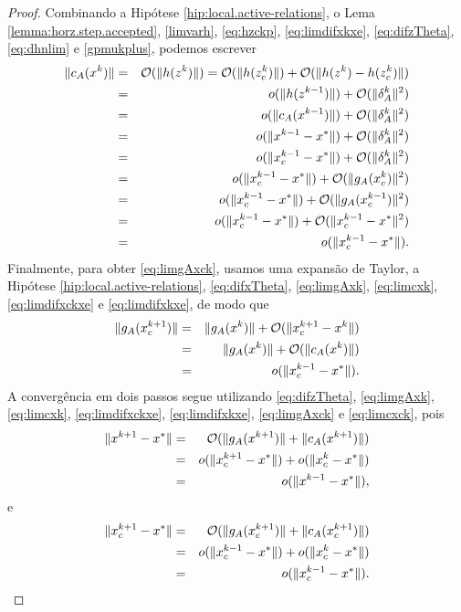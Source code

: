 \begin{proof}
Combinando a Hipótese \ref{hip:local.active-relations}, o Lema
\ref{lemma:horz.step.accepted}, \eqref{limvarh}, \eqref{eq:hzckp},
\eqref{eq:limdifxkxe}, \eqref{eq:difzTheta}, \eqref{eq:dhnlim} e
\eqref{gpmukplus}, podemos escrever
\begin{eqnarray*}
 \Vert c_A(x^k)\Vert & = & \mathcal{O}(\Vert h(z^k)\Vert) = \mathcal{O}(\Vert h(z_c^{k})\Vert) + \mathcal{O}(\Vert h(z^k) 
- h(z_c^{k})\Vert) \nonumber \\
& = & o(\Vert h(z^{k-1})\Vert) + \mathcal{O}(\Vert \delta_A^k\Vert^2) \nonumber \\
& = & o(\Vert c_A(x^{k-1})\Vert) + \mathcal{O}(\Vert \delta_A^k\Vert^2) \nonumber \\
& = & o(\Vert x^{k-1} - x^*\Vert) + \mathcal{O}(\Vert \delta_A^k\Vert^2) \nonumber \\
& = & o(\Vert x_c^{k-1} - x^*\Vert) + \mathcal{O}(\Vert \delta_A^k\Vert^2) \nonumber \\
& = & o(\Vert x_c^{k-1} - x^*\Vert) + \mathcal{O}(\Vert g_A(x_c^{k})\Vert^2) \nonumber \\
& = & o(\Vert x_c^{k-1} - x^*\Vert) + \mathcal{O}(\Vert g_A(x_c^{k-1})\Vert^2) \nonumber \\
& = & o(\Vert x_c^{k-1} - x^*\Vert) + \mathcal{O}(\Vert x_c^{k-1} - x^*\Vert^2) \nonumber \\
& = & o(\Vert x_c^{k-1} - x^*\Vert).
\end{eqnarray*}
Finalmente, para obter \eqref{eq:limgAxck}, usamos uma expansão de Taylor, a Hipótese 
\ref{hip:local.active-relations}, \eqref{eq:difxTheta}, 
\eqref{eq:limgAxk}, \eqref{eq:limcxk}, \eqref{eq:limdifxckxe} e \eqref{eq:limdifxkxe},
de modo que
\begin{eqnarray*}
 \Vert g_A(x_c^{k+1})\Vert & = & \Vert g_A(x^k)\Vert + \mathcal{O}(\Vert x_c^{k+1} - x^k\Vert) \\
 & = & \Vert g_A(x^k)\Vert + \mathcal{O}(\Vert c_A(x^k)\Vert) \\
 & = & o(\Vert x_c^{k-1} - x^*\Vert).
\end{eqnarray*}
A convergência em dois passos segue utilizando \eqref{eq:difzTheta}, \eqref{eq:limgAxk}, 
\eqref{eq:limcxk}, \eqref{eq:limdifxckxe}, \eqref{eq:limdifxkxe}, \eqref{eq:limgAxck} e 
\eqref{eq:limcxck}, pois
\begin{eqnarray}
 \norma{x^{k+1} - x^*} & = & \bigo(\norma{g_A(x^{k+1})} + \norma{c_A(x^{k+1})}) \nonumber \\
 & = & o(\norma{\xc{k+1} - x^*}) + o(\norma{\xc{k} - x^*}) \nonumber \\
 & = & o(\norma{x^{k-1} - x^*}),\visiblelbl{eq:2stepxk}
\end{eqnarray}
e
\begin{eqnarray}
 \norma{\xc{k+1} - x^*} & = & \bigo(\norma{g_A(\xc{k+1})} + \norma{c_A(\xc{k+1})}) \nonumber \\
 & = & o(\norma{\xc{k-1} - x^*}) + o(\norma{\xc{k} - x^*}) \nonumber \\
 & = & o(\norma{\xc{k-1} - x^*}).\visiblelbl{eq:2stepxck}
\end{eqnarray}


\end{proof}
